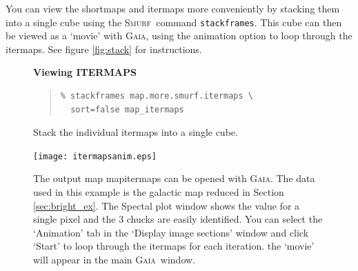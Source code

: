 \documentclass[twoside,11pt]{article}
\newenvironment{fmpage}[1]
{\begin{lrbox}{\fmbox}\begin{minipage}{#1}}
{\end{minipage}\end{lrbox}\fbox{\usebox{\fmbox}}}
\newcounter{box}
\newcommand{\xref}[3]{#1}
\renewcommand{\_}{\texttt{\symbol{95}}}
\newenvironment{myquote}{\begin{quote}\begin{small}}{\end{small}\end{quote}}
\newcommand{\gaia}{\xref{\textsc{Gaia}}{sun214}{}}
\newcommand{\smurf}{\xref{\textsc{Smurf}}{sun258}{}}
\begin{document}
You can view the shortmaps and itermaps more conveniently by stacking them into a single cube using the \smurf\ command \texttt{stackframes}. This cube can then be viewed as a `movie' with \gaia, using the animation option to loop through the itermaps. See figure \ref{fig:stack} for instructions.
\begin{figure}[ht!]
\begin{center}
\begin{fmpage}{0.95\linewidth}
\vspace{0.2cm}
\hspace{2mm}
\textbf{Viewing ITERMAPS}

\vspace{0.5cm}

\begin{minipage}[c]{0.65\linewidth}

\begin{myquote}
\begin{verbatim}
% stackframes map.more.smurf.itermaps \
  sort=false map_itermaps
\end{verbatim}
\end{myquote}
\end{minipage}
\hspace{0.3cm}
\begin{minipage}[c]{0.29\linewidth}
Stack the individual itermaps into a single cube.
\end{minipage}

\vspace{0.5cm}

\begin{minipage}[c]{0.65\linewidth}
\centering
\texttt{[image: itermaps\_anim.eps]}

\end{minipage}
\hspace{0.3cm}
\begin{minipage}[c]{0.29\linewidth}
The output  map map\_itermaps can be opened with \gaia. The data used in this example is the galactic map reduced in Section \ref{sec:bright_ex}. The Spectal plot window shows the value for a single pixel and the 3 chucks are easily identified. You can select the `Animation' tab in the `Display image sections' window and click `Start' to loop through the itermaps for each iteration. the `movie' will appear in the main \gaia\ window.
\end{minipage}

\vspace{0.7cm}


\end{fmpage}
\end{center}
\end{figure}
\end{document}
